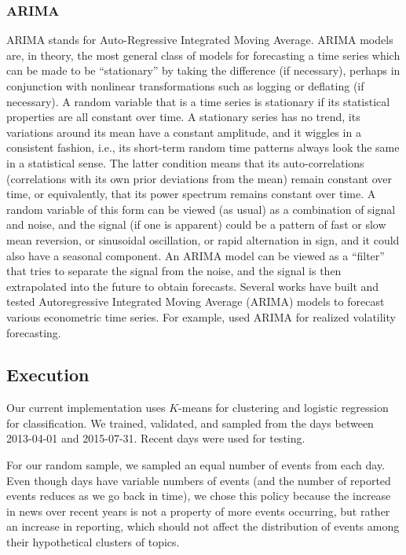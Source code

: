 \subsubsection{ARIMA}
ARIMA stands for Auto-Regressive Integrated Moving Average. ARIMA models are, in theory, the most general class of models for forecasting a time series which can be made to be “stationary” by taking the difference (if necessary), perhaps in conjunction with nonlinear transformations such as logging or deflating (if necessary). A random variable that is a time series is stationary if its statistical properties are all constant over time.  A stationary series has no trend, its variations around its mean have a constant amplitude, and it wiggles in a consistent fashion, i.e., its short-term random time patterns always look the same in a statistical sense. The latter condition means that its auto-correlations (correlations with its own prior deviations from the mean) remain constant over time, or equivalently, that its power spectrum remains constant over time.  A random variable of this form can be viewed (as usual) as a combination of signal and noise, and the signal (if one is apparent) could be a pattern of fast or slow mean reversion, or sinusoidal oscillation, or rapid alternation in sign, and it could also have a seasonal component.  An ARIMA model can be viewed as a “filter” that tries to separate the signal from the noise, and the signal is then extrapolated into the future to obtain forecasts. Several works have built and tested Autoregressive Integrated Moving Average (ARIMA) models to forecast various econometric time series. For example, \cite{Vol} used ARIMA for realized volatility forecasting.

\subsection{Execution}

Our current implementation uses $K$-means for clustering and logistic regression for classification. We trained, validated, and sampled from the days between 2013-04-01 and 2015-07-31. Recent days were used for testing.

For our random sample, we sampled an equal number of events from each day. Even though days have variable numbers of events (and the number of reported events reduces as we go back in time), we chose this policy because the increase in news over recent years is not a property of more events occurring, but rather an increase in reporting, which should not affect the distribution of events among their hypothetical clusters of topics.

